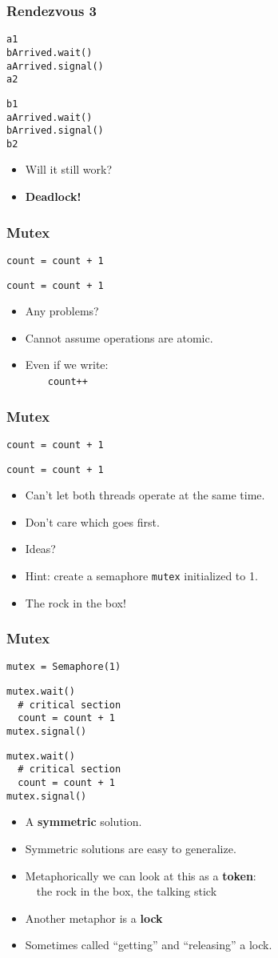\documentclass{beamer}
\newcommand{\bi}{\begin{itemize}}
\newcommand{\ii}{\item}
\newcommand{\ei}{\end{itemize}}
\newcommand{\bfr}[1]{\begin{frame}[fragile]\frametitle{{ #1 }}}
\begin{document}
\bfr{Rendezvous 3}
\begin{multicols}{2}
\begin{Verbatim}[label=Thread A]
a1
bArrived.wait()
aArrived.signal()
a2
\end{Verbatim}
\begin{Verbatim}[label=Thread B]
b1
aArrived.wait()
bArrived.signal()
b2
\end{Verbatim}
\end{multicols}
\bi
\ii Will it still work?\pause
\ii {\bf Deadlock!}
\ei
\end{frame}

\bfr{Mutex}
\begin{multicols}{2}
\begin{Verbatim}[label=Thread A]
count = count + 1
\end{Verbatim}
\begin{Verbatim}[label=Thread B]
count = count + 1
\end{Verbatim}
\end{multicols}
\bi
\ii Any problems?
\pause
\ii Cannot assume operations are atomic.
\ii Even if we write:\\\ \ \ \ {\tt count++}
\ei
\end{frame}

\bfr{Mutex}
\begin{multicols}{2}
\begin{Verbatim}[label=Thread A]
count = count + 1
\end{Verbatim}
\begin{Verbatim}[label=Thread B]
count = count + 1
\end{Verbatim}
\end{multicols}
\bi
\ii Can't let both threads operate at the same time.
\ii Don't care which goes first.
\ii Ideas?
\pause
\ii Hint: create a semaphore {\tt mutex} initialized to 1.
\ii The rock in the box!
\ei
\end{frame}


\bfr{Mutex}
\begin{Verbatim}[label=Initialization]
  mutex = Semaphore(1)
\end{Verbatim}

\begin{multicols}{2}
\begin{Verbatim}[label=Thread A]
mutex.wait()
  # critical section
  count = count + 1
mutex.signal()
\end{Verbatim}
\begin{Verbatim}[label=Thread B]
mutex.wait()
  # critical section
  count = count + 1
mutex.signal()
\end{Verbatim}
\end{multicols}
\pause
\bi
\ii A {\bf symmetric} solution.
\ii Symmetric solutions are easy to generalize.
\pause
\ii Metaphorically we can look at this as a {\bf token}:\\\ \  the rock in
the box, the  talking stick
\pause
\ii Another metaphor is a {\bf lock}
\ii Sometimes called ``getting'' and ``releasing'' a lock.
\ei
\end{frame}
\end{document}
